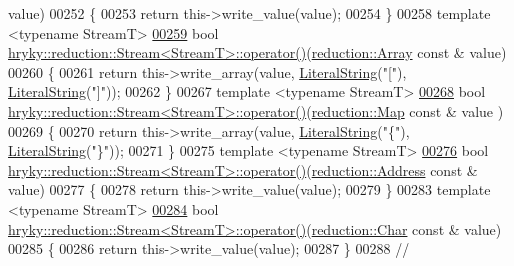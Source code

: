 \begin{DoxyCode}
      value)
00252 \{
00253     \textcolor{keywordflow}{return} this->write\_value(value);
00254 \}
00258 \textcolor{keyword}{template} <\textcolor{keyword}{typename} StreamT>
\hypertarget{reduction__stream_8h_source_l00259}{}\hyperlink{classhryky_1_1reduction_1_1_stream_a598f5d80a4e694f96b73a99270d6ede7}{00259} \textcolor{keywordtype}{bool} \hyperlink{classhryky_1_1reduction_1_1_stream}{hryky::reduction::Stream<StreamT>::operator()}(\hyperlink{classhryky_1_1reduction_1_1_array}{reduction::Array} \textcolor{keyword}{const} & 
      value)
00260 \{
00261     \textcolor{keywordflow}{return} this->write\_array(value, \hyperlink{classhryky_1_1_literal_string}{LiteralString}(\textcolor{stringliteral}{"["}), \hyperlink{classhryky_1_1_literal_string}{LiteralString}(\textcolor{stringliteral}{"]"}));
00262 \}
00267 \textcolor{keyword}{template} <\textcolor{keyword}{typename} StreamT>
\hypertarget{reduction__stream_8h_source_l00268}{}\hyperlink{classhryky_1_1reduction_1_1_stream_a61e65ade4befc36dd0119ea6c16d1f3c}{00268} \textcolor{keywordtype}{bool} \hyperlink{classhryky_1_1reduction_1_1_stream}{hryky::reduction::Stream<StreamT>::operator()}(\hyperlink{classhryky_1_1reduction_1_1_map}{reduction::Map} \textcolor{keyword}{const} & value
      )
00269 \{
00270     \textcolor{keywordflow}{return} this->write\_array(value, \hyperlink{classhryky_1_1_literal_string}{LiteralString}(\textcolor{stringliteral}{"\{"}), \hyperlink{classhryky_1_1_literal_string}{LiteralString}(\textcolor{stringliteral}{"\}"}));
00271 \}
00275 \textcolor{keyword}{template} <\textcolor{keyword}{typename} StreamT>
\hypertarget{reduction__stream_8h_source_l00276}{}\hyperlink{classhryky_1_1reduction_1_1_stream_a278377a56ed28a05e782cb4612f5e6e0}{00276} \textcolor{keywordtype}{bool} \hyperlink{classhryky_1_1reduction_1_1_stream}{hryky::reduction::Stream<StreamT>::operator()}(\hyperlink{classhryky_1_1reduction_1_1_address}{reduction::Address} \textcolor{keyword}{const} & 
      value)
00277 \{
00278     \textcolor{keywordflow}{return} this->write\_value(value);
00279 \}
00283 \textcolor{keyword}{template} <\textcolor{keyword}{typename} StreamT>
\hypertarget{reduction__stream_8h_source_l00284}{}\hyperlink{classhryky_1_1reduction_1_1_stream_a58305f4a500836101b55410729ca82a1}{00284} \textcolor{keywordtype}{bool} \hyperlink{classhryky_1_1reduction_1_1_stream}{hryky::reduction::Stream<StreamT>::operator()}(\hyperlink{classhryky_1_1reduction_1_1_char}{reduction::Char} \textcolor{keyword}{const} & 
      value)
00285 \{
00286     \textcolor{keywordflow}{return} this->write\_value(value);
00287 \}
00288 \textcolor{comment}{//
}
\end{DoxyCode}
